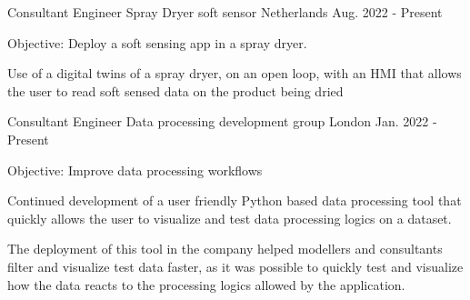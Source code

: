 \begin{cventries}
  \cventry
    {Consultant Engineer} %
    {Spray Dryer soft sensor} %
    {Netherlands} %
    {Aug. 2022 - Present} %
    {
      \begin{cvitems} %
        \item {Objective: Deploy a soft sensing app  in a spray dryer. }
        \item {Use of a digital twins of a spray dryer, on an open loop, with an HMI that allows the user to read soft sensed data on the product being dried }
       \end{cvitems}
    }
  \cventry
    {Consultant Engineer} %
    {Data processing development group} %
    {London} %
    {Jan. 2022 - Present} %
    {
      \begin{cvitems} %
        \item {Objective: Improve data processing workflows }
        \item {Continued development of a user friendly Python based data processing tool that quickly allows the user to visualize and test data processing logics on a dataset. }
        \item {The deployment of this tool in the company helped modellers and consultants filter and visualize test data faster, as it was possible to quickly test and visualize how the data reacts to the processing logics allowed by the application. }
       \end{cvitems}
    }


\end{cventries}

